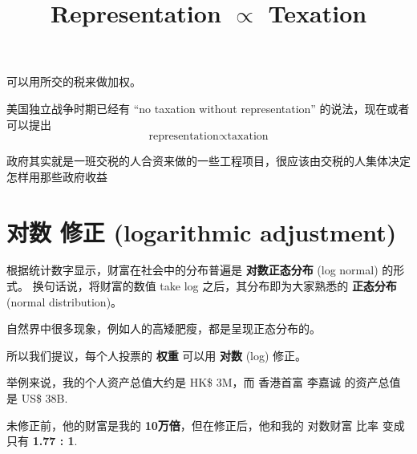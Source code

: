 \documentclass[12pt, orivec]{article}
\title{\color{blue} Representation $\propto$ Texation}
\newcommand{\cc}[2]{#1}
\newcommand{\cc}[2]{#2}
\begin{document}
\setlength{\parindent}{0pt}
\setlength{\parskip}{2.8ex plus0.8ex minus0.8ex}

\maketitle


可以用所交的税来做加权。 

美国独立战争时期已经有 ``no taxation without representation'' 的说法，现在或者可以提出
\begin{equation}
\mbox{representation} \propto \mbox{taxation}
\end{equation}

政府其实就是一班交税的人合资来做的一些工程项目，很应该由交税的人集体决定怎样用那些政府收益

\section{\cc{对数 修正 (logarithmic adjustment)}{Logarithmic adjustment}}

根据统计数字显示，财富在社会中的分布普遍是 \textbf{对数正态分布} (log normal) 的形式。 换句话说，将财富的数值 take log 之后，其分布即为大家熟悉的 \textbf{正态分布} (normal distribution)。

自然界中很多现象，例如人的高矮肥瘦，都是呈现正态分布的。 

所以我们提议，每个人投票的 \textbf{权重} 可以用 \textbf{对数} (log) 修正。

举例来说，我的个人资产总值大约是 HK\$ 3M，而 香港首富 李嘉诚 的资产总值 是 US\$ 38B.

未修正前，他的财富是我的 \textbf{10万倍}，但在修正后，他和我的 对数财富 比率 变成只有 \textbf{1.77 : 1}.

\printbibliography
\end{document}
